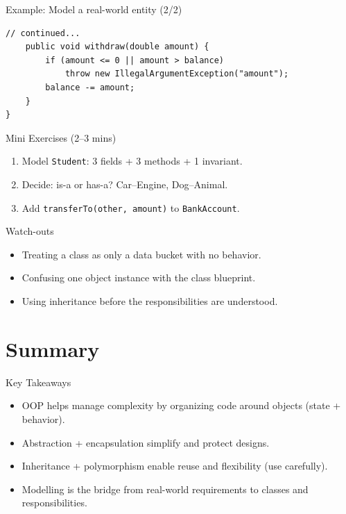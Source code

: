 \documentclass{beamer}
\begin{document}
\begin{frame}[fragile]{Example: Model a real-world entity (2/2)}
\begin{lstlisting}
// continued...
    public void withdraw(double amount) {
        if (amount <= 0 || amount > balance)
            throw new IllegalArgumentException("amount");
        balance -= amount;
    }
}
\end{lstlisting}
  \slidesources{\OOPSUnitISources}
\end{frame}

\begin{frame}{Mini Exercises (2--3 mins)}
  \begin{enumerate}[<+->]
    \item Model \texttt{Student}: 3 fields + 3 methods + 1 invariant.
    \item Decide: is-a or has-a?\; Car--Engine,\; Dog--Animal.
    \item Add \texttt{transferTo(other, amount)} to \texttt{BankAccount}.
  \end{enumerate}
  \slidesources{\OOPSUnitISources}
\end{frame}

\begin{frame}{Watch-outs}
\begin{itemize}[<+->]
  \item Treating a class as only a data bucket with no behavior.
  \item Confusing one object instance with the class blueprint.
  \item Using inheritance before the responsibilities are understood.
\end{itemize}
  \slidesources{\OOPSUnitISources}
\end{frame}

\section{Summary}
\label{sec:summary}

\begin{frame}{Key Takeaways}
  \begin{itemize}[<+->]
    \item OOP helps manage complexity by organizing code around objects (state + behavior).
    \item Abstraction + encapsulation simplify and protect designs.
    \item Inheritance + polymorphism enable reuse and flexibility (use carefully).
    \item Modelling is the bridge from real-world requirements to classes and responsibilities.
  \end{itemize}
  \slidesources{\OOPSUnitISources}
\end{frame}
\end{document}
